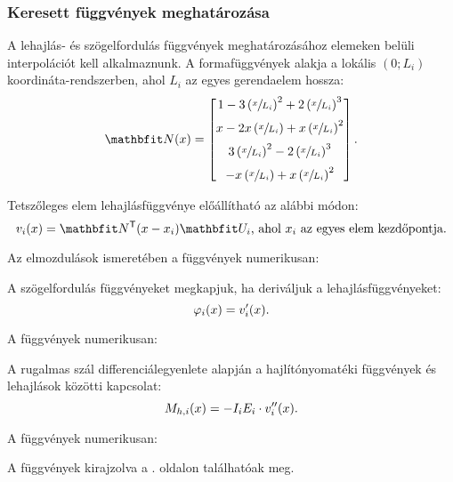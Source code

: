 \subsubsection{Keresett függvények meghatározása}

A lehajlás- és szögelfordulás függvények meghatározásához elemeken belüli
interpolációt kell alkalmaznunk. A formafüggvények alakja a lokális $(0; L_i)$
koordináta-rendszerben, ahol $L_i$ az egyes gerendaelem hossza:
\begin{equation}
  \renewcommand\a{\left(\sfrac{x}{L_i}\right)}
  \rvec N(x) =
  \begin{bmatrix}
    1 - 3\a^2 + 2\a^3 \\[2mm]
    x - 2x\a + x\a^2  \\[2mm]
    3\a^2 - 2\a^3     \\[2mm]
    -x\a + x\a^2
  \end{bmatrix}
  \text.
  \label{eq:N-param}
\end{equation}

Tetszőleges elem lehajlásfüggvénye előállítható az alábbi módon:
\begin{equation}
  v_i(x) = \rvec N^{\mathsf T}(x - x_i) \rvec U_i
  \text{, ahol } x_i \text{ az egyes elem kezdőpontja.}
  \label{eq:v-param}
\end{equation}

Az elmozdulások ismeretében a függvények numerikusan:


A szögelfordulás függvényeket megkapjuk, ha deriváljuk a lehajlásfüggvényeket:
\begin{equation}
  \varphi_i(x) = v_i'(x)
  \text.
  \label{eq:phi-param}
\end{equation}

A függvények numerikusan:


A rugalmas szál differenciálegyenlete alapján a hajlítónyomatéki függvények
és lehajlások közötti kapcsolat:
\begin{equation}
  M_{h,i}(x) = -I_i E_i \cdot v_i''(x)
  \text.
  \label{eq:Mh-param}
\end{equation}

A függvények numerikusan:

% 
A függvények kirajzolva a \pageref{fig:plot-v}. oldalon találhatóak meg.
